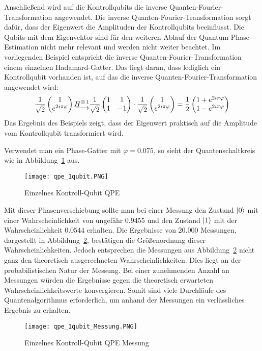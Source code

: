 Anschließend wird auf die Kontrollqubits die inverse Quanten-Fourier-Transformation angewendet.
Die inverse Quanten-Fourier-Transformation sorgt dafür, 
dass der Eigenwert die Amplituden der Kontrollqubits beeinflusst.
Die Qubits mit dem Eigenvektor sind für den weiteren Ablauf der Quantum-Phase-Estimation nicht mehr relevant 
und werden nicht weiter beachtet.
Im vorliegenden Beispiel entspricht die inverse Quanten-Fourier-Transformation einem einzelnen Hadamard-Gatter. 
Das liegt daran, dass lediglich ein Kontrollqubit vorhanden ist, 
auf das die inverse Quanten-Fourier-Transformation angewendet wird:
\[
\frac{1}{\sqrt{2}}
\begin{pmatrix}
  1 \\
  e^{2 i \pi \varphi}
 \end{pmatrix}
 \underrightarrow{H^{\operatorname{\otimes}1}}
 \frac{1}{\sqrt{2}}
 \begin{pmatrix}
  1 & 1\\
  1 & -1
 \end{pmatrix}
 \cdot
 \frac{1}{\sqrt{2}}
\begin{pmatrix}
  1 \\
  e^{2 i \pi \varphi}
 \end{pmatrix}
 =
 \frac{1}{2}
 \begin{pmatrix}
  1 + e^{2 i \pi \varphi}\\
  1 - e^{2 i \pi \varphi}
 \end{pmatrix}
\]
Das Ergebnis des Beispiels zeigt, dass der Eigenwert praktisch auf die Amplitude vom Kontrollqubit transformiert wird.

Verwendet man ein Phase-Gatter mit \(\varphi  = 0.075\), 
so sieht der Quantenschaltkreis wie in Abbildung~\ref{fig:qpe_1qubit} aus.
\begin{figure}[H]
  \centering
  \texttt{[image: qpe\_1qubit.PNG]}
  \caption{Einzelnes Kontroll-Qubit QPE}
  \label{fig:qpe_1qubit}
\end{figure}
Mit dieser Phasenverschiebung sollte man bei einer Messung den Zustand \(\ket{0}\)
mit einer Wahrscheinlichkeit von ungefähr \(0.9455\) 
und den Zustand \(\ket{1}\) mit der Wahrscheinlichkeit \(0.0544\) erhalten.
Die Ergebnisse von 20.000 Messungen, dargestellt in Abbildung~\ref{fig:qpe_1qubit_Messung}, 
bestätigen die Größenordnung dieser Wahrscheinlichkeiten.
Jedoch entsprechen die Messungen aus Abbildung~\ref{fig:qpe_1qubit_Messung} nicht ganz den theoretisch ausgerechneten Wahrscheinlichkeiten.
Dies liegt an der probabilistischen Natur der Messung.
Bei einer zunehmenden Anzahl an Messungen würden die Ergebnisse gegen die theoretisch erwarteten Wahrscheinlichkeitswerte konvergieren.
Somit sind viele Durchläufe des Quantenalgorithmus erforderlich, 
um anhand der Messungen ein verlässliches Ergebnis zu erhalten.
\begin{figure}[H]
  \caption{Einzelnes Kontroll-Qubit QPE Messung}
  \label{fig:qpe_1qubit_Messung}
  \texttt{[image: qpe\_1qubit\_Messung.PNG]}
  \centering
  \end{figure}
  

